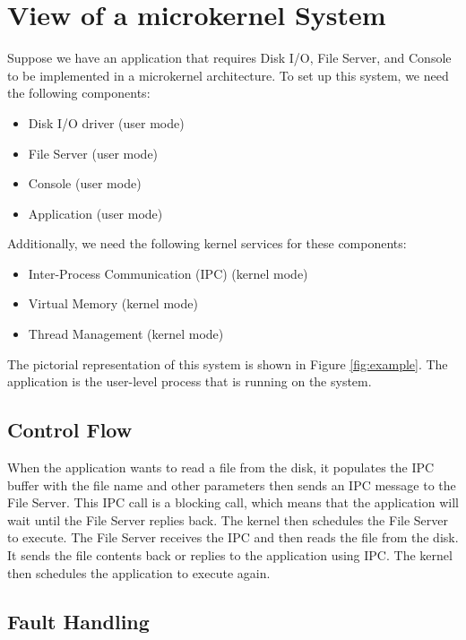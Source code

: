 \documentclass[
	a4paper, %
	11pt, %
	unnumberedsections, %
	twoside, %
]{LTJournalArticle}
\begin{document}
\section{View of a microkernel System}

Suppose we have an application that requires Disk I/O, File Server, and Console to be implemented in a microkernel architecture. To set up this system, we need the following components:

\begin{itemize}
	\item Disk I/O driver (user mode)
	\item File Server (user mode)
	\item Console (user mode)
	\item Application (user mode)
\end{itemize}

Additionally, we need the following kernel services for these components:
\begin{itemize}
	\item Inter-Process Communication (IPC) (kernel mode)
	\item Virtual Memory (kernel mode)
	\item Thread Management (kernel mode)
\end{itemize}

The pictorial representation of this system is shown in Figure \ref{fig:example}. The application is the user-level process that is running on the system.

\subsection{Control Flow}

When the application wants to read a file from the disk, it populates the IPC buffer with the file name and other parameters then sends an IPC message to the File Server. This IPC call is a blocking call, which means that the application will wait until the File Server replies back. The kernel then schedules the File Server to execute. The File Server receives the IPC and then reads the file from the disk. It sends the file contents back or replies to the application using IPC. The kernel then schedules the application to execute again.

\subsection{Fault Handling}
\end{document}
